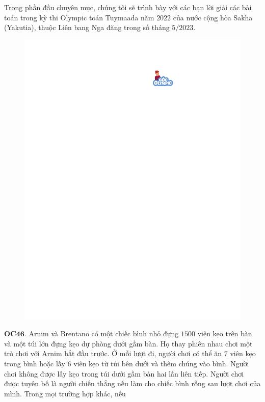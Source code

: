 \begin{multicols}{2}
	Trong phần đầu chuyên mục, chúng tôi sẽ trình bày với các bạn lời giải các bài toán trong kỳ thi Olympic toán Tuymaada năm $2022$ của nước cộng hòa Sakha (Yakutia), thuộc Liên bang Nga đăng trong số tháng $5/2023$. 
	\begin{figure}[H]
		\vspace*{-5pt}
		\centering
		\captionsetup{labelformat= empty, justification=centering}
		\includegraphics[width= 1\linewidth]{gocolympic}
		\vspace*{-15pt}
	\end{figure}
	{\bf\color{cackithi} OC$\pmb{46.}$} Arnim và Brentano có một chiếc bình nhỏ đựng $1500$ viên kẹo trên bàn và một túi lớn đựng kẹo dự phòng dưới gầm bàn. Họ thay phiên nhau chơi một trò chơi với Arnim bắt đầu trước. Ở mỗi lượt đi, người chơi có thể ăn $7$ viên kẹo trong bình hoặc lấy 6 viên kẹo từ túi bên dưới và thêm chúng vào bình. Người chơi không được lấy kẹo trong túi dưới gầm bàn hai lần liên tiếp. Người chơi được tuyên bố là người chiến thắng nếu làm cho chiếc bình rỗng sau lượt chơi của mình. Trong mọi trường hợp khác, nếu

\end{multicols}
